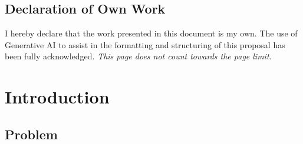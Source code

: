 \documentclass[a4paper,11pt]{article}
\begin{document}
\begin{titlepage}
	\begin{abstract}
		As 6G and AI-enabled Radio Access Network (AI-RAN) architectures mature, the Radio Access Network (RAN) is increasingly treated not only as communications infrastructure but also as a distributed accelerator platform for edge AI services. The unresolved systems question is not whether such infrastructure occasionally exposes transient resources, but how heterogeneous inference workloads can consume bounded, revocable execution opportunities without violating strict QoS preservation for primary radio functions. To operationalize that question, the project develops a unified multi-tenant inference runtime for shared RAN infrastructure around bounded execution windows, workload-aware segmentation, context offloading, hard memory budgeting, and preemption-safe execution. Rather than treating inference as a GPU-only task, the runtime explicitly coordinates the radio uplink for input data, the accelerator compute phase, and the downlink for results so that network bottlenecks and accelerator scheduling decisions are managed together. Methodologically, the work profiles representative workload families, derives a shared runtime-control abstraction, implements the design in a bounded prototype, and evaluates whether useful goodput can be delivered while remaining subordinate to RAN-first timing constraints.
	\end{abstract}

	\section*{Declaration of Own Work}

	I hereby declare that the work presented in this document is my own. The use of Generative AI to assist in the formatting and structuring of this proposal has been fully acknowledged.
	\vfill
	\noindent\textit{This page does not count towards the page limit.}
\end{titlepage}

\hypersetup{pageanchor=true}
\setcounter{page}{1}

\section{Introduction}

\subsection{Problem}
\end{document}

